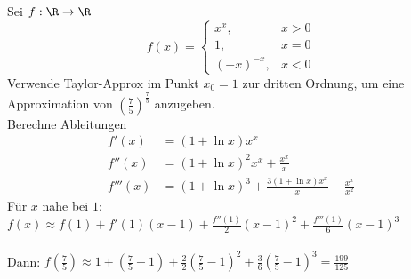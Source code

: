 

\begin{example}
	Sei $f : \R \to \R$
	\begin{equation*}
		f(x) = \begin{cases}
			x^x, & x > 0\\
			1, & x=0\\
			(-x)^{-x}, & x < 0
		\end{cases}
	\end{equation*}
	Verwende Taylor-Approx im Punkt $x_0 = 1$ zur dritten Ordnung, um eine Approximation von $\left( \frac{7}{5}
	\right)^{\frac{7}{5}}$ anzugeben.\\
	Berechne Ableitungen
	\begin{align*}
		f'(x) &= (1 + \ln x) x^x\\
		f''(x) &= (1 + \ln x)^2 x^x + \frac{x^x}{x}\\
		f'''(x) &= (1 + \ln x)^3 + \frac{3(1 + \ln x) x^x}{x} - \frac{x^x}{x^2} 
	\end{align*}
	Für $x$ nahe bei $1$: $f(x) \approx f(1) + f'(1)(x-1) + \frac{f''(1)}{2} (x-1)^2 + \frac{f'''(1)}{6} (x-1)^3$\\ \\
	Dann: $f \left( \frac{7}{5} \right) \approx 1 + \left( \frac{7}{5} -1 \right) + \frac{2}{2} \left( \frac{7}{5}
		-1\right)^2 + \frac{3}{6} \left( \frac{7}{5} - 1 \right)^3 = \frac{199}{125}$
\end{example}
